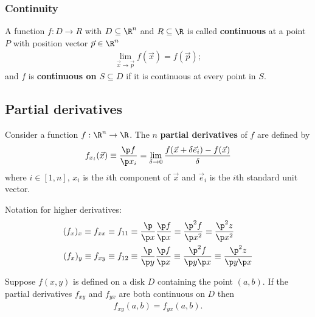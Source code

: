 \documentclass{article}
\begin{document}
\subsubsection{Continuity}

\begin{definition}
    A function $f:D\to R$ with $D\subseteq\R^n$ and $R\subseteq\R$
    is called \textbf{continuous} at a point $P$ with position vector $\vec p\in \R^n$
    \begin{align*}
        \lim_{\vec x\to \vec p}f(\vec x) = f(\vec p);
    \end{align*}
    and $f$ is \textbf{continuous on $S\subseteq D$} if it is continuous at
    every point in $S$.
\end{definition}


\subsection{Partial derivatives}


\begin{definition}
    Consider a function $f:\R^n\to\R$. The $n$ \textbf{partial derivatives} of
    $f$ are defined by
    \begin{align*}
        f_{x_i}(\vec x)\equiv\frac{\p f}{\p x_i}=\lim_{\delta\to 0}\frac{f(\vec x + \delta \vec e_i)-f(\vec x)}{\delta}
    \end{align*}
    where $i\in[1,n]$, $x_i$ is the $i$th component of $\vec x$ and $\vec e_i$ is the
    $i$th standard unit vector.
\end{definition}
Notation for higher derivatives:
\begin{align*}
    (f_x)_x \equiv f_{xx} \equiv f_{11}
     & \equiv \frac{\p}{\p x}\frac{\p f}{\p x}
    \equiv \frac{\p^2 f}{\p x^2}
    \equiv \frac{\p^2 z}{\p x^2}               \\
    (f_x)_y \equiv f_{xy} \equiv f_{12}
     & \equiv \frac{\p}{\p y}\frac{\p f}{\p x}
    \equiv \frac{\p^2 f}{\p y \p x}
    \equiv \frac{\p^2 z}{\p y \p x}            \\
\end{align*}
\begin{theorem}
    Suppose $f(x,y)$ is defined on a disk $D$ containing the point $(a,b)$.
    If the partial derivatives $f_{xy}$ and $f_{yx}$ are both continuous
    on $D$ then
    \begin{align*}
        f_{xy}(a,b)=f_{yx}(a,b).
    \end{align*}
\end{theorem}
\end{document}
